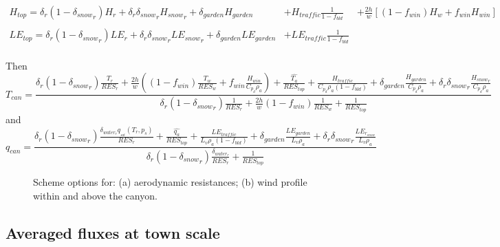 \begin{eqnarray}\label{CanyonFlux}
	H_{top} = \delta_r(1-{\delta_{snow}}_r) H_{r} + \delta_r{\delta_{snow}}_r {H_{snow}}_r 
+\delta_{garden}H_{garden}  \nonumber & + H_{traffic} \frac{1}{1-f_{bld}}&+ \frac{2h}{w}\left[(1-f_{win})H_{w} +f_{win}H_{win}\right]
 \\
&&\\
 LE_{top} = \delta_r(1-{\delta_{snow}}_r)LE_{r} + \delta_r{\delta_{snow}}_r {LE_{snow}}_r+\delta_{garden}LE_{garden} &+ LE_{traffic}\frac{1}{1-f_{bld}}&
        \nonumber \\
&&
\end{eqnarray}

Then
\begin{equation}
	T_{can} = \frac{\delta_r(1-{\delta_{snow}}_r)\frac{T_r}{RES_r}+\frac{2h}{w} \left((1-f_{win})\frac{T_w}{RES_w}
                          + f_{win} \frac{H_{win}}{C_{p_d}\rho_a} \right)
                                 +\frac{\hat{T_a}}{RES_{top}}
                                 +\frac{H_{traffic}}{C_{p_d}\rho_a (1-f_{bld})}
				 +\delta_{garden}\frac{H_{garden}}{C_{p_d}\rho_a}
                                 +\delta_r{\delta_{snow}}_r\frac{{H_{snow}}_r}{C_{p_d}\rho_a } }
{\delta_r(1-{\delta_{snow}}_r)\frac{1}{RES_r}+\frac{2h}{w} (1-f_{win})\frac{1}{RES_w}
                                 +\frac{1}{RES_{top}}}
\end{equation}
and
\begin{equation}
	q_{can} = \frac{  \delta_r(1-{\delta_{snow}}_r)\frac{\delta_{water_r}{q_{_{sat}}}(T_r,p_s) }
                                            {RES_r}
                + \frac{\hat{q_a}}{RES_{top}} 
                + \frac{LE_{traffic}}{L_v\rho_a (1-f_{bld})} 
	 +\delta_{garden}\frac{LE_{garden}}{L_v\rho_a}
                + {\delta_r\delta_{snow}}_r\frac{LE_{r_{snow}}}{L_v\rho_a } }
		{  \delta_r(1-{\delta_{snow}}_r)\frac{\delta_{water_r} }{RES_r}
                + \frac{1}{RES_{top}} }
\end{equation}

\begin{figure}[t]
\hspace*{0.cm}
\caption{Scheme options for: (a) aerodynamic resistances; (b)
wind profile within and above the canyon.}
\label{flux}
\end{figure}

\subsection{Averaged fluxes at town scale}

